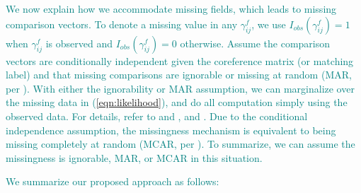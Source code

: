 \documentclass[ba]{imsart}
\begin{document}

\textcolor{teal}{We now explain how we accommodate missing fields, which leads to missing comparison vectors. To denote a missing value in any $\gamma_{ij}^f$, we use $I_{obs}(\gamma_{ij}^f)=1$ when $\gamma_{ij}^f$ is observed and $I_{obs}(\gamma_{ij}^f)=0$ otherwise. Assume the comparison vectors are conditionally independent given the coreference matrix (or matching label) and that missing comparisons are ignorable or missing at random (MAR, per \cite{LittleRubin2002}). With either the ignorability or MAR assumption, we can marginalize over the missing data in (\ref{eqn:likelihood}), and do all computation simply using the observed data. For details, refer to \cite[Section 6.2]{LittleRubin2002} and \cite[Section 3.1]{sadinle_detecting_2014}, and \citep[Section 4.2]{sadinle_bayesian_2017}. Due to the conditional independence assumption, the missingness mechanism is equivalent to being missing completely at random (MCAR, per \cite[p. 12]{LittleRubin2002}). To summarize, we can assume the missingness is ignorable, MAR, or MCAR in this situation.}


\textcolor{teal}{We summarize our proposed approach as follows:} 
\end{document}
